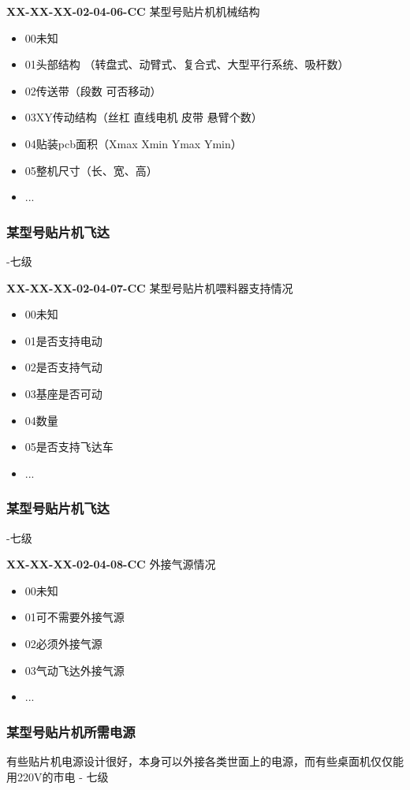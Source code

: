 \documentclass[a4paper,12pt,UTF8]{article}
\begin{document}
\textbf{XX-XX-XX-02-04-06-CC} 某型号贴片机机械结构
\begin{itemize}
  \item 00未知%
  \item 01头部结构 （转盘式、动臂式、复合式、大型平行系统、吸杆数）
  \item 02传送带（段数 可否移动）
  \item 03XY传动结构（丝杠 直线电机 皮带 悬臂个数）
  \item 04贴装pcb面积（Xmax Xmin  Ymax Ymin）
  \item 05整机尺寸（长、宽、高）
  \item ...
\end{itemize}

\subsubsection{某型号贴片机飞达}
-七级

\textbf{XX-XX-XX-02-04-07-CC} 某型号贴片机喂料器支持情况
\begin{itemize}
  \item 00未知%
  \item 01是否支持电动
  \item 02是否支持气动
  \item 03基座是否可动
  \item 04数量
  \item 05是否支持飞达车
  \item ...
\end{itemize}

\subsubsection{某型号贴片机飞达}
-七级

\textbf{XX-XX-XX-02-04-08-CC} 外接气源情况
\begin{itemize}
  \item 00未知%
  \item 01可不需要外接气源
  \item 02必须外接气源
  \item 03气动飞达外接气源
  \item ...
\end{itemize}

\subsubsection{某型号贴片机所需电源}
有些贴片机电源设计很好，本身可以外接各类世面上的电源，而有些桌面机仅仅能用220V的市电 - 七级
\end{document}
